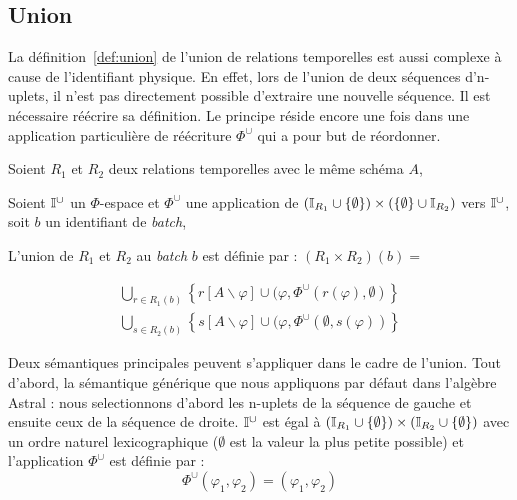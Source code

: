 \subsection{Union}
La définition~\ref{def:union} de l'union de relations temporelles est aussi complexe à cause de l'identifiant physique. En effet, lors de l'union de deux séquences d'n-uplets, il n'est pas directement possible d'extraire une nouvelle séquence. Il est nécessaire réécrire sa définition. Le principe réside encore une fois dans une application particulière de réécriture $\Phi^\cup$ qui a pour but de réordonner.
\begin{defi}\label{def:union}
    Soient $R_1$ et $R_2$ deux relations temporelles avec le même schéma $A$,

    Soient $\mathbb{I}^{\cup}$ un $\Phi$-espace et $\Phi^\cup$ une application de $(\mathbb{I}_{R_1}\cup\{\emptyset\})\times(\{\emptyset\}\cup\mathbb{I}_{R_2})$ vers $\mathbb{I}^\cup$, soit $b$ un identifiant de \textit{batch},

    L'union de $R_1$ et $R_2$ au \textit{batch} $b$ est définie par : $(R_1\times R_2)(b)=$ 

        $$\begin{array}{c}
            \bigcup_{\scriptstyle r \in R_1(b)} \left\{ r[A\backslash \varphi] \cup (\varphi, \Phi^\cup(r(\varphi),\emptyset) \right\} \\
            \bigcup_{\scriptstyle s \in R_2(b)} \left\{ s[A\backslash \varphi] \cup (\varphi, \Phi^\cup(\emptyset,s(\varphi)) \right\}
        \end{array}$$
\end{defi}

Deux sémantiques principales peuvent s'appliquer dans le cadre de l'union. Tout d'abord, la sémantique générique que nous appliquons par défaut dans l'algèbre Astral : nous selectionnons d'abord les n-uplets de la séquence de gauche et ensuite ceux de la séquence de droite. $\mathbb{I}^\cup$ est égal à $(\mathbb{I}_{R_1}\cup \{\emptyset\})\times (\mathbb{I}_{R_2}\cup \{\emptyset\})$ avec un ordre naturel lexicographique ($\emptyset$ est la valeur la plus petite possible) et l'application $\Phi^\cup$ est définie par : $$\Phi^\cup(\varphi_1,\varphi_2) = (\varphi_1,\varphi_2)$$

